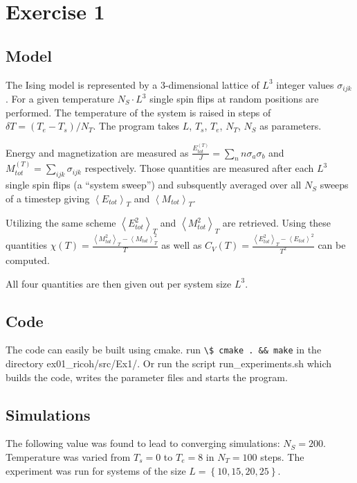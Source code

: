 \documentclass[a4paper]{scrreprt}
\begin{document}

\chapter*{Exercise 1}

\section*{Model}
The Ising model is represented by a 3-dimensional lattice of $L^3$ integer values $\sigma_{ijk}$. 
For a given temperature $N_S\cdot L^3$ single spin flips at random positions are performed.
The temperature of the system is raised in steps of $\delta T = \left(T_e - T_s\right) / N_T$.
The program takes $L$, $T_s$, $T_e$, $N_T$, $N_S$ as parameters.

Energy and magnetization are measured as $\frac{E^{(T)}_{tot}}{J} = \sum_nn \sigma_{a} \sigma_{b}$ and
$M^{(T)}_{tot} = \sum_{ijk} \sigma_{ijk}$ respectively.
Those quantities are measured after each $L^3$ single spin flips (a ``system sweep'') and 
subsquently averaged over all $N_S$ sweeps of a timestep giving $\left<E_{tot}\right>_T$ and 
$\left<M_{tot}\right>_T$.

Utilizing the same scheme $\left<E^2_{tot}\right>_T$ and $\left<M^2_{tot}\right>_T$ are retrieved.
Using these quantities $\chi (T) = \frac{ \left<M^2_{tot}\right>_T - \left<M_{tot}\right>_T^2 }{T}$
as well as $C_V(T) = \frac{ \left<E^2_{tot}\right>_T - \left<E_{tot}\right>^2 }{T^2}$ can be computed.

All four quantities are then given out per system size $L^3$.

\section*{Code}
The code can easily be built using cmake. run \verb*|\$ cmake . && make| in the directory ex01\_ricoh/src/Ex1/. Or run the script run\_experiments.sh which builds the code, writes the parameter files and starts the program.

\section*{Simulations}
The following value was found to lead to converging simulations: $N_S = 200$.
Temperature was varied from $T_s = 0$ to $T_e = 8$ in $N_T = 100$ steps.
The experiment was run for systems of the size $L = \left\{10, 15, 20, 25\right\}$.
\end{document}
